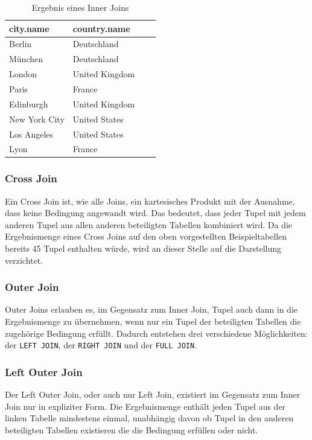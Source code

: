 \documentclass[a4paper]{article}
\begin{document}
\begin{minipage}{\textwidth}
\begin{minipage}[b]{0.49\textwidth}
\end{minipage}
\hfill
\begin{minipage}[b]{0.49\textwidth}
\begin{table}[H]
\centering
  \begin{tabular}{| l | l | l | l |}
    \hline
    city.name & country.name\\ \hline
    \hline
   Berlin & Deutschland \\ \hline
   München & Deutschland \\ \hline
   London & United Kingdom \\ \hline
   Paris & France \\ \hline
   Edinburgh & United Kingdom \\ \hline
   New York City & United States \\ \hline
   Los Angeles & United States \\ \hline
   Lyon & France \\ \hline
  \end{tabular}
\caption{Ergebnis eines Inner Joins}
\label{tab:inner-join}
\end{table}
\end{minipage}
\end{minipage}

\subsubsection{Cross Join}
Ein Cross Join ist, wie alle Joins, ein kartesisches Produkt mit der Ausnahme, dass keine Bedingung angewandt wird. Das bedeutet, dass jeder Tupel mit jedem anderen Tupel aus allen anderen beteiligten Tabellen kombiniert wird. Da die Ergebnismenge eines Cross Joins auf den oben vorgestellten Beispieltabellen bereits 45 Tupel enthalten würde, wird an dieser Stelle auf die Darstellung verzichtet.

\subsubsection{Outer Join}
Outer Joins erlauben es, im Gegensatz zum Inner Join, Tupel auch dann in die Ergebnismenge zu übernehmen, wenn nur ein Tupel der beteiligten Tabellen die zugehörige Bedingung erfüllt. Dadurch entstehen drei verschiedene Möglichkeiten: der \texttt{LEFT JOIN}, der \texttt{RIGHT JOIN} und der \texttt{FULL JOIN}.

\subsubsection{Left Outer Join}
\label{sec:left-join}
Der Left Outer Join, oder auch nur Left Join, existiert im Gegensatz zum Inner Join nur in expliziter Form. Die Ergebnismenge enthält jeden Tupel aus der linken Tabelle mindestens einmal, unabhängig davon ob Tupel in den anderen beteiligten Tabellen existieren die die Bedingung erfüllen oder nicht.
\end{document}
